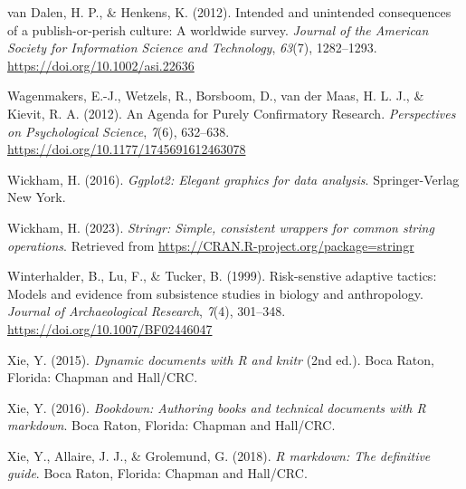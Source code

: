 \documentclass[
  ,man,mask,floatsintext]{apa6}
\newlength{\cslhangindent}
\newlength{\cslentryspacingunit} %
\newenvironment{CSLReferences}[2] %
 {%
  \setlength{\parindent}{0pt}
  \ifodd #1
  \let\oldpar\par
  \def\par{\hangindent=\cslhangindent\oldpar}
  \fi
  \setlength{\parskip}{#2\cslentryspacingunit}
 }%
 {}
\begin{document}
\begin{CSLReferences}{1}{0}
\leavevmode{}%
van Dalen, H. P., \& Henkens, K. (2012). Intended and unintended consequences of a publish-or-perish culture: {A} worldwide survey. \emph{Journal of the American Society for Information Science and Technology}, \emph{63}(7), 1282--1293. \url{https://doi.org/10.1002/asi.22636}

\leavevmode{}%
Wagenmakers, E.-J., Wetzels, R., Borsboom, D., van der Maas, H. L. J., \& Kievit, R. A. (2012). An {Agenda} for {Purely Confirmatory Research}. \emph{Perspectives on Psychological Science}, \emph{7}(6), 632--638. \url{https://doi.org/10.1177/1745691612463078}

\leavevmode{}%
Wickham, H. (2016). \emph{Ggplot2: {Elegant} graphics for data analysis}. Springer-Verlag New York.

\leavevmode{}%
Wickham, H. (2023). \emph{Stringr: Simple, consistent wrappers for common string operations}. Retrieved from \url{https://CRAN.R-project.org/package=stringr}

\leavevmode{}%
Winterhalder, B., Lu, F., \& Tucker, B. (1999). Risk-senstive adaptive tactics: {Models} and evidence from subsistence studies in biology and anthropology. \emph{Journal of Archaeological Research}, \emph{7}(4), 301--348. \url{https://doi.org/10.1007/BF02446047}

\leavevmode{}%
Xie, Y. (2015). \emph{Dynamic documents with {R} and knitr} (2nd ed.). Boca Raton, Florida: {Chapman and Hall/CRC}.

\leavevmode{}%
Xie, Y. (2016). \emph{Bookdown: {Authoring} books and technical documents with {R} markdown}. Boca Raton, Florida: {Chapman and Hall/CRC}.

\leavevmode{}%
Xie, Y., Allaire, J. J., \& Grolemund, G. (2018). \emph{R markdown: {The} definitive guide}. Boca Raton, Florida: {Chapman and Hall/CRC}.

\end{CSLReferences}
\end{document}
